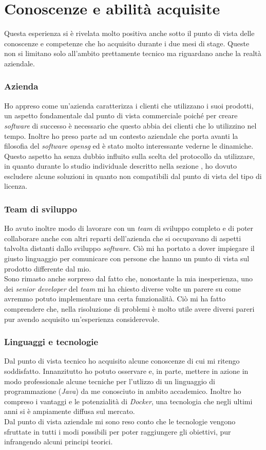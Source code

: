 \newpage

\section{Conoscenze e abilità acquisite}
Questa esperienza si è rivelata molto positiva anche sotto il punto di vista delle conoscenze e competenze che ho acquisito durante i due mesi di stage.
Queste non si limitano solo all'ambito prettamente tecnico ma riguardano anche la realtà aziendale. 
\subsubsection{Azienda}
Ho appreso come un'azienda caratterizza i clienti che utilizzano i suoi prodotti, un aspetto fondamentale dal punto di vista commerciale poiché per creare \textit{software} di successo è necessario che questo abbia dei clienti che lo utilizzino nel tempo. Inoltre ho preso parte ad un contesto aziendale che porta avanti la filosofia del \textit{software} \textit{\gls{opensg}} ed è stato molto interessante vederne le dinamiche. \\
Questo aspetto ha senza dubbio influito sulla scelta del protocollo da utilizzare, in quanto durante lo studio individuale descritto nella sezione , ho dovuto escludere alcune soluzioni in quanto non compatibili dal punto di vista del tipo di licenza.

\subsubsection{Team di sviluppo}
Ho avuto inoltre modo di lavorare con un \textit{team} di sviluppo completo e di poter collaborare anche con altri reparti dell'azienda che si occupavano di aspetti talvolta distanti dallo sviluppo \textit{software}. Ciò mi ha portato a dover impiegare il giusto linguaggio per comunicare con persone che hanno un punto di vista sul prodotto differente dal mio. \\
Sono rimasto anche sorpreso dal fatto che, nonostante la mia inesperienza, uno dei \textit{senior developer} del \textit{team} mi ha chiesto diverse volte un parere su come avremmo potuto implementare una certa funzionalità. Ciò mi ha fatto comprendere che, nella risoluzione di problemi è molto utile avere diversi pareri pur avendo acquisito un'esperienza considerevole.

\subsubsection{Linguaggi e tecnologie}
Dal punto di vista tecnico ho acquisito alcune conoscenze di cui mi ritengo soddisfatto. Innanzitutto ho potuto osservare e, in parte, mettere in azione in modo professionale alcune tecniche per l'utlizzo di un linguaggio di programmazione (\textit{Java}) da me conosciuto in ambito accademico.
Inoltre ho compreso i vantaggi e le potenzialità di \textit{Docker}, una tecnologia che negli ultimi anni si è ampiamente diffusa sul mercato. \\
Dal punto di vista aziendale mi sono reso conto che le tecnologie vengono sfruttate in tutti i modi possibili per poter raggiungere gli obiettivi, pur infrangendo alcuni principi teorici.

